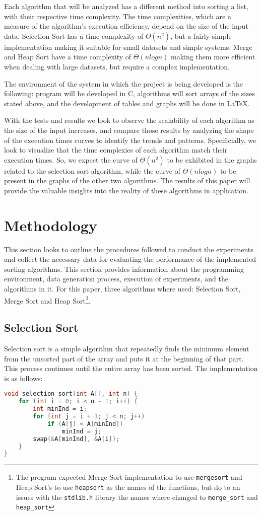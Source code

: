 \documentclass[conference]{IEEEtran}
\begin{document}
Each algorithm that will be analyzed has a different method into sorting a list, with their respective time complexity. The time complexities, which are a measure of the algorithm's execution efficiency, depend on the size of the input data. Selection Sort has a time complexity of $\Theta(n^{2})$, but a fairly simple implementation making it suitable for small datasets and simple systems. Merge and Heap Sort have a time complexity of $\Theta(nlogn)$ making them more efficient when dealing with large datasets, but require a complex implementation.

The environment of the system in which the project is being developed is the following: program will be developed in C, algorithms will sort arrays of the sizes stated above, and the development of tables and graphs will be done in LaTeX. 

With the tests and results we look to observe the scalability of each algorithm as the size of the input increases, and compare those results by analyzing the shape of the execution times curves to identify the trends and patterns. Specificially, we look to visualize that the time complexies of each algorithm match their execution times. So, we expect the curve of $\Theta(n^{2})$ to be exhibited in the graphs related to the selection sort algorithm, while the curve of $\Theta(nlogn)$ to be present in the graphs of the other two algorithms. The results of this paper will provide the valuable insights into the reality of these algorithms in application. 

\section{Methodology}
This section looks to outline the procedures followed to conduct the experiments and collect the necessary data for evaluating the performance of the implemented sorting algorithms. This section provides information about the programming environment, data generation process, execution of experiments, and the algorithms in it. For this paper, three algorithms where used: Selection Sort, Merge Sort and Heap Sort\footnote{The program expected Merge Sort implementation to use \texttt{mergesort} and Heap Sort's to use \texttt{heapsort} as the names of the functions, but do to an issues with the \texttt{stdlib.h} library the names where changed to \texttt{merge\_sort} and \texttt{heap\_sort}}.
\subsection{Selection Sort}
Selection sort is a simple algorithm that repeatedly finds the minimum element from the unsorted part of the array and puts it at the beginning of that part. This process continues until the entire array has been sorted. The implementation is as follows: 
\begin{lstlisting}[language=C]
void selection_sort(int A[], int n) {
    for (int i = 0; i < n - 1; i++) {
        int minInd = i;
        for (int j = i + 1; j < n; j++)
            if (A[j] < A[minInd])
                minInd = j;
        swap(&A[minInd], &A[i]);
    }
}   
\end{lstlisting}
\end{document}
